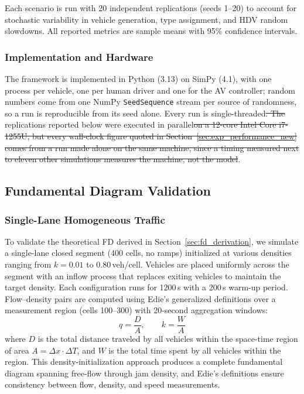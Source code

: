 \documentclass[review,authoryear]{elsarticle}
\providecommand{\DIFaddtex}[1]{{\protect\color{blue}\uwave{#1}}} %
\providecommand{\DIFdeltex}[1]{{\protect\color{red}\sout{#1}}}                      %
\providecommand{\DIFaddbegin}{} %
\providecommand{\DIFaddend}{} %
\providecommand{\DIFdelbegin}{} %
\providecommand{\DIFdelend}{} %
\providecommand{\DIFadd}[1]{\texorpdfstring{\DIFaddtex{#1}}{#1}} %
\providecommand{\DIFdel}[1]{\texorpdfstring{\DIFdeltex{#1}}{}} %
\newcommand{\DIFscaledelfig}{0.5}
\newlength{\DIFdelgraphicswidth} %
\newlength{\DIFdelgraphicsheight} %
\newcommand{\DIFaddincludegraphics}[2][]{{\color{blue}\fbox{\DIFOincludegraphics[#1]{#2}}}} %
\newcommand{\DIFdelincludegraphics}[2][]{%
\sbox{\DIFdelgraphicsbox}{\DIFOincludegraphics[#1]{#2}}%
\settoboxwidth{\DIFdelgraphicswidth}{\DIFdelgraphicsbox} %
\settoboxtotalheight{\DIFdelgraphicsheight}{\DIFdelgraphicsbox} %
\scalebox{\DIFscaledelfig}{%
\parbox[b]{\DIFdelgraphicswidth}{\usebox{\DIFdelgraphicsbox}\\[-\baselineskip] \rule{\DIFdelgraphicswidth}{0em}}\llap{\resizebox{\DIFdelgraphicswidth}{\DIFdelgraphicsheight}{%
\setlength{\unitlength}{\DIFdelgraphicswidth}%
\begin{picture}(1,1)%
\thicklines\linethickness{2pt} %
{\color[rgb]{1,0,0}\put(0,0){\framebox(1,1){}}}%
{\color[rgb]{1,0,0}\put(0,0){\line( 1,1){1}}}%
{\color[rgb]{1,0,0}\put(0,1){\line(1,-1){1}}}%
\end{picture}%
}\hspace*{3pt}}} %
} %
\DeclareRobustCommand{\DIFaddbegin}{\DIFOaddbegin \let\includegraphics\DIFaddincludegraphics} %
\DeclareRobustCommand{\DIFaddend}{\DIFOaddend \let\includegraphics\DIFOincludegraphics} %
\DeclareRobustCommand{\DIFdelbegin}{\DIFOdelbegin \let\includegraphics\DIFdelincludegraphics} %
\DeclareRobustCommand{\DIFdelend}{\DIFOaddend \let\includegraphics\DIFOincludegraphics} %
\begin{document}
Each scenario is run with 20 independent replications (seeds 1--20) to account for stochastic variability in vehicle generation, type assignment, and HDV random slowdowns. All reported metrics are sample means with 95\% confidence intervals.

\subsubsection{Implementation and Hardware}

The framework is implemented in Python (3.13) on SimPy (4.1), with one process per vehicle, one per human driver and one for the AV controller; random numbers come from one NumPy \texttt{SeedSequence} stream per source of randomness, so a run is reproducible from its seed alone. Every run is single-threaded\DIFdelbegin \DIFdel{. The }\DIFdelend \DIFaddbegin \DIFadd{; the }\DIFaddend replications reported below were executed in parallel\DIFdelbegin \DIFdel{on a 12-core Intel Core i7-1255U, but every wall-clock figure quoted in Section~\ref{sec:exp_performance_new} comes from a run made alone on the same machine, since a timing measured next to eleven other simulations measures the machine, not the model}\DIFdelend .


\subsection{Fundamental Diagram Validation}
\label{sec:exp_fd}

\subsubsection{Single-Lane Homogeneous Traffic}

To validate the theoretical FD derived in Section~\ref{sec:fd_derivation}, we simulate a single-lane closed segment (400 cells, no ramps) initialized at various densities ranging from $k = 0.01$ to $0.80$\,veh/cell. Vehicles are placed uniformly across the segment with an inflow process that replaces exiting vehicles to maintain the target density. Each configuration runs for 1200\,s with a 200\,s warm-up period. Flow--density pairs are computed using Edie's generalized definitions \citep{edie1963discussion} over a measurement region (cells 100--300) with 20-second aggregation windows:
\begin{equation}
    q = \frac{D}{A}, \qquad k = \frac{W}{A}
    \label{eq:fd_measurement}
\end{equation}
where $D$ is the total distance traveled by all vehicles within the space-time region of area $A = \Delta x \cdot \Delta T$, and $W$ is the total time spent by all vehicles within the region. This density-initialization approach produces a complete fundamental diagram spanning free-flow through jam density, and Edie's definitions ensure consistency between flow, density, and speed measurements.
\end{document}

